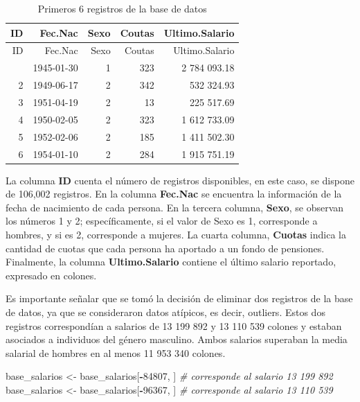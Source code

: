 \documentclass[
]{article}
\newenvironment{Shaded}{\begin{snugshade}}{\end{snugshade}}
\newcommand{\CommentTok}[1]{\textcolor[rgb]{0.56,0.35,0.01}{\textit{#1}}}
\newcommand{\DecValTok}[1]{\textcolor[rgb]{0.00,0.00,0.81}{#1}}
\newcommand{\NormalTok}[1]{#1}
\newcommand{\OtherTok}[1]{\textcolor[rgb]{0.56,0.35,0.01}{#1}}
\newcommand{\SpecialCharTok}[1]{\textcolor[rgb]{0.81,0.36,0.00}{\textbf{#1}}}
\begin{document}
\begin{longtable}[]{@{}rrrrr@{}}
\caption{Primeros 6 registros de la base de datos}\tabularnewline
\toprule\noalign{}
ID & Fec.Nac & Sexo & Coutas & Ultimo.Salario \\
\midrule\noalign{}
\endfirsthead
\toprule\noalign{}
ID & Fec.Nac & Sexo & Coutas & Ultimo.Salario \\
\midrule\noalign{}
\endhead
\bottomrule\noalign{}
\endlastfoot
1 & 1945-01-30 & 1 & 323 & 2 784 093.18 \\
2 & 1949-06-17 & 2 & 342 & 532 324.93 \\
3 & 1951-04-19 & 2 & 13 & 225 517.69 \\
4 & 1950-02-05 & 2 & 323 & 1 612 733.09 \\
5 & 1952-02-06 & 2 & 185 & 1 411 502.30 \\
6 & 1954-01-10 & 2 & 284 & 1 915 751.19 \\
\end{longtable}

La columna \textbf{ID} cuenta el número de registros disponibles, en
este caso, se dispone de 106,002 registros. En la columna
\textbf{Fec.Nac} se encuentra la información de la fecha de nacimiento
de cada persona. En la tercera columna, \textbf{Sexo}, se observan los
números 1 y 2; específicamente, si el valor de Sexo es 1, corresponde a
hombres, y si es 2, corresponde a mujeres. La cuarta columna,
\textbf{Cuotas} indica la cantidad de cuotas que cada persona ha
aportado a un fondo de pensiones. Finalmente, la columna
\textbf{Ultimo.Salario} contiene el último salario reportado, expresado
en colones.

Es importante señalar que se tomó la decisión de eliminar dos registros
de la base de datos, ya que se consideraron datos atípicos, es decir,
outliers. Estos dos registros correspondían a salarios de 13 199 892 y
13 110 539 colones y estaban asociados a individuos del género
masculino. Ambos salarios superaban la media salarial de hombres en al
menos 11 953 340 colones.

\begin{Shaded}
\begin{Highlighting}[]
\NormalTok{base\_salarios }\OtherTok{\textless{}{-}}\NormalTok{ base\_salarios[}\SpecialCharTok{{-}}\DecValTok{84807}\NormalTok{, ] }\CommentTok{\# corresponde al salario 13 199 892}
\NormalTok{base\_salarios }\OtherTok{\textless{}{-}}\NormalTok{ base\_salarios[}\SpecialCharTok{{-}}\DecValTok{96367}\NormalTok{, ] }\CommentTok{\# corresponde al salario 13 110 539}
\end{Highlighting}
\end{Shaded}
\end{document}
